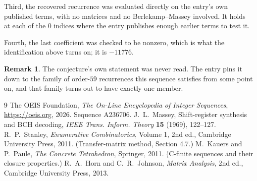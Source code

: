\documentclass[11pt,a4paper]{article}
\theoremstyle{plain}
\theoremstyle{definition}
\newtheorem{remark}[theorem]{Remark}
\begin{document}
Third, the recovered recurrence was evaluated directly on the entry's own published terms, with
no matrices and no Berlekamp--Massey involved. It holds at each of the $0$ indices where
the entry publishes enough earlier terms to test it.

Fourth, the last coefficient was checked to be nonzero, which is what the identification above
turns on; it is $-11776$.

\begin{remark}
The conjecture's own statement was never read. The entry pins it down to the family of
order-$59$ recurrences this sequence satisfies from some point on, and that family turns
out to have exactly one member.
\end{remark}

\begin{thebibliography}{9}
 The OEIS Foundation, \emph{The On-Line Encyclopedia of Integer
Sequences}, \url{https://oeis.org}, 2026. Sequence A236706.
 J.~L.~Massey, Shift-register synthesis and BCH decoding, \emph{IEEE
Trans. Inform. Theory} \textbf{15} (1969), 122--127.
 R.~P.~Stanley, \emph{Enumerative Combinatorics}, Volume 1, 2nd ed.,
Cambridge University Press, 2011. (Transfer-matrix method, Section 4.7.)
 M.~Kauers and P.~Paule, \emph{The Concrete Tetrahedron}, Springer, 2011.
(C-finite sequences and their closure properties.)
 R.~A.~Horn and C.~R.~Johnson, \emph{Matrix Analysis}, 2nd ed., Cambridge
University Press, 2013.
\end{thebibliography}
\end{document}
